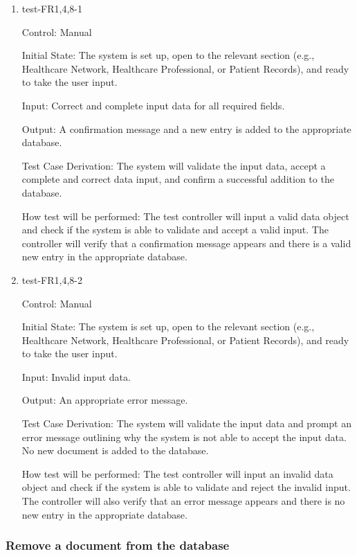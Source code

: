 \documentclass[12pt, titlepage]{article}
\begin{document}
\begin{enumerate}

\item{test-FR1,4,8-1} \label{test-FR1,4,8-1}

Control: Manual

Initial State: The system is set up, open to the relevant section (e.g., Healthcare Network, Healthcare Professional, or Patient Records), and ready to take the user input.

Input: Correct and complete input data for all required fields.

Output: A confirmation message and a new entry is added to the appropriate database.

Test Case Derivation: The system will validate the input data, accept a complete and correct data input, and confirm a successful addition to the database.

How test will be performed: The test controller will input a valid data object and check if the system is able to validate and accept a valid input. The controller will verify that a confirmation message appears and there is a valid new entry in the appropriate database.

					
\item{test-FR1,4,8-2} \label{test-FR1,4,8-2}

Control: Manual
					
Initial State: The system is set up, open to the relevant section (e.g., Healthcare Network, Healthcare Professional, or Patient Records), and ready to take the user input.

Input: Invalid input data.

Output: An appropriate error message.

Test Case Derivation: The system will validate the input data and prompt an error message outlining why the system is not able to accept the input data. No new document is added to the database.

How test will be performed: The test controller will input an invalid data object and check if the system is able to validate and reject the invalid input. The controller will also verify that an error message appears and there is no new entry in the appropriate database.

\end{enumerate}


\subsubsection{Remove a document from the database} \label{section:4.1.2}
\end{document}

